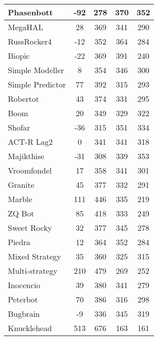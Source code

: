 \begin{table}
\begin{tabular}{|l|c|c|c|c|}
Phasenbott & -92 & 278 & 370 & 352 \\ \hline 
MegaHAL & 28 & 369 & 341 & 290 \\ \hline 
RussRocker4 & -12 & 352 & 364 & 284 \\ \hline 
Biopic & -22 & 369 & 391 & 240 \\ \hline 
Simple Modeller & 8 & 354 & 346 & 300 \\ \hline 
\rowcolor{HighlightRowColor} Simple Predictor & 77 & 392 & 315 & 293 \\ \hline 
Robertot & 43 & 374 & 331 & 295 \\ \hline 
Boom & 20 & 349 & 329 & 322 \\ \hline 
Shofar & -36 & 315 & 351 & 334 \\ \hline 
ACT-R Lag2 & 0 & 341 & 341 & 318 \\ \hline 
Majikthise & -31 & 308 & 339 & 353 \\ \hline 
Vroomfondel & 17 & 358 & 341 & 301 \\ \hline 
Granite & 45 & 377 & 332 & 291 \\ \hline 
\rowcolor{HighlightRowColor} Marble & 111 & 446 & 335 & 219 \\ \hline 
\rowcolor{HighlightRowColor} ZQ Bot & 85 & 418 & 333 & 249 \\ \hline 
Sweet Rocky & 32 & 377 & 345 & 278 \\ \hline 
Piedra & 12 & 364 & 352 & 284 \\ \hline 
Mixed Strategy & 35 & 360 & 325 & 315 \\ \hline 
\rowcolor{HighlightRowColor} Multi-strategy & 210 & 479 & 269 & 252 \\ \hline 
Inocencio & 39 & 380 & 341 & 279 \\ \hline 
\rowcolor{HighlightRowColor} Peterbot & 70 & 386 & 316 & 298 \\ \hline 
Bugbrain & -9 & 336 & 345 & 319 \\ \hline 
\rowcolor{HighlightRowColor} Knucklehead & 513 & 676 & 163 & 161 \\ \hline
        \end{tabular}
    \end{table}